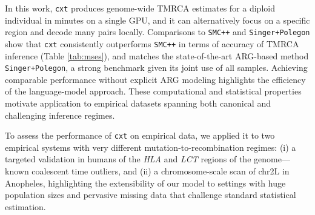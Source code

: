 \documentclass{article}
\newcommand{\cxtkit}{\texttt{cxt}\xspace}
\newcommand{\smcpp}{\texttt{SMC++}\xspace}
\begin{document}

In this work, \cxtkit produces genome-wide TMRCA estimates for a diploid individual in minutes on a single GPU,
and it can alternatively focus on a specific region and decode many pairs locally.
Comparisons to \smcpp and \texttt{Singer+Polegon} show that \cxtkit 
consistently outperforms \smcpp in terms of accuracy of TMRCA inference (Table \ref{tab:mses}), and matches the state-of-the-art 
ARG-based method \texttt{Singer+Polegon}, 
a strong benchmark given its joint use of all samples. 
Achieving comparable performance without explicit ARG modeling highlights the efficiency of the language-model approach. 
These computational and statistical properties motivate application to empirical datasets spanning both canonical and challenging inference regimes.

To assess the performance of \cxtkit on empirical data, 
we applied it to two empirical systems with very different mutation-to-recombination regimes:
(i) a targeted validation in humans of the \emph{HLA} and \emph{LCT} regions of the genome--- known coalescent time outliers,
and (ii) a chromosome-scale scan of chr2L in Anopheles, 
highlighting the extensibility of our model to settings with huge population sizes
and pervasive missing data that challenge standard statistical estimation.
\end{document}
